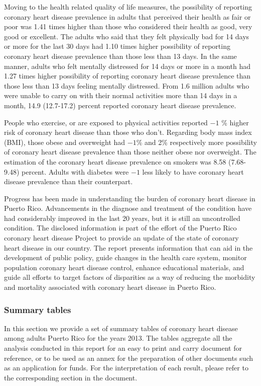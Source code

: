 Moving to the health related quality of life measures, the possibility of reporting coronary heart disease prevalence in adults that perceived their health as fair or poor was 1.41 times higher than those who considered their health as good, very good or excellent. The adults who said that they felt physically bad for 14 days or more for the last 30 days had 1.10 times higher possibility of reporting coronary heart disease prevalence than those less than 13 days. In the same manner, adults who felt mentally distressed for 14 days or more in a month had 1.27 times higher possibility of reporting coronary heart disease prevalence than those less than 13 days feeling mentally distressed. From 1.6 million adults who were unable to carry on with their normal activities more than 14 days in a month, 14.9 (12.7-17.2) percent reported coronary heart disease prevalence. 

People who exercise, or are exposed to physical activities reported \ensuremath{-1} \% higher risk of coronary heart disease than those who don't.  Regarding body mass index (BMI), those obese and overweight had \ensuremath{-1}\% and 2\% respectively more possibility of coronary heart disease prevalence than those neither obese nor overweight. The estimation of the coronary heart disease prevalence on smokers was 8.58 (7.68-9.48) percent.  Adults with diabetes were \ensuremath{-1}\5 less likely to have coronary heart disease prevalence than their counterpart.



Progress has been made in understanding the burden of coronary heart disease in Puerto Rico. Advancements in the diagnose and treatment of the condition have had considerably improved in the last 20 years, but it is still an uncontrolled condition. The disclosed information is part of the effort of the Puerto Rico coronary heart disease Project to provide an update of the state of coronary heart disease in our country. The report presents information that can aid in the development of public policy, guide changes in the health care system, monitor population coronary heart disease control, enhance educational materials, and guide all efforts to target factors of disparities as a way of reducing the morbidity and mortality associated with coronary heart disease in Puerto Rico.

\newpage
\subsubsection{Summary tables}
In this section we provide a set of summary tables of coronary heart disease among adults Puerto Rico for the years 2013. The tables aggregate all the analysis conducted in this report for an easy to print and carry document for reference, or to be used as an annex for the preparation of other documents such as an application for funds. For the interpretation of each result, please refer to the corresponding section in the document.


